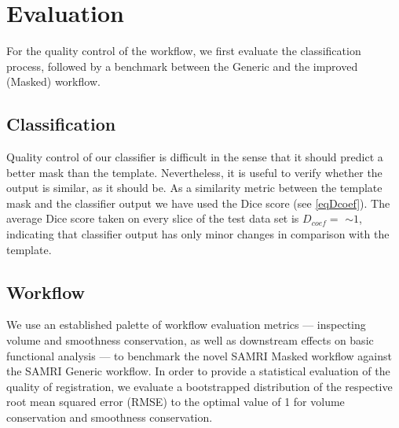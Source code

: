 \section{Evaluation}
For the quality control of the workflow, we first evaluate the classification process, followed by a benchmark between the Generic and the improved (Masked) workflow.

\subsection{Classification}
Quality control of our classifier is difficult in the sense that it should predict a better mask than the template.
Nevertheless, it is useful to verify whether the output is similar, as it should be.
As a similarity metric between the template mask and the classifier output we have used the Dice score (see \cref{eqDcoef}).
The average Dice score taken on every slice of the test data set is $D_{coef}= $  $\sim 1$, indicating that classifier output has only minor changes in comparison with the template.

\begin{sansmath}
\end{sansmath}

\subsection{Workflow}
We use an established palette of workflow evaluation metrics --- inspecting volume and smoothness conservation, as well as downstream effects on basic functional analysis \cite{ioanas_optimized_2019} --- to benchmark the novel SAMRI Masked workflow against the SAMRI Generic workflow.
In order to provide a statistical evaluation of the quality of registration, we evaluate a bootstrapped distribution of the respective root mean squared error (RMSE) to the optimal value of 1 for volume conservation and smoothness conservation.
